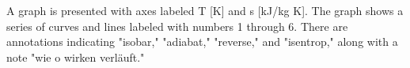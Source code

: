 A graph is presented with axes labeled T [K] and s [kJ/kg K]. The graph shows a series of curves and lines labeled with numbers 1 through 6. There are annotations indicating "isobar," "adiabat," "reverse," and "isentrop," along with a note "wie o wirken verläuft."